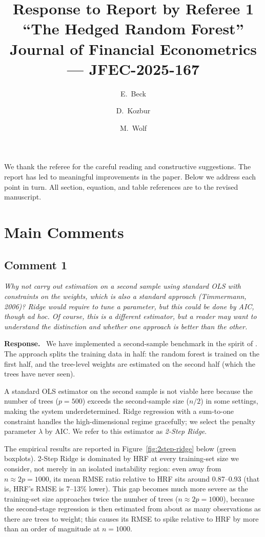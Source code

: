 \documentclass[12pt]{article}
\title{Response to Report by Referee 1\\[6pt]
  \large ``The Hedged Random Forest''\\
  \normalsize Journal of Financial Econometrics --- JFEC-2025-167}
\author{E.\ Beck \and D.\ Kozbur \and M.\ Wolf}
\date{}
\newcommand{\comment}[1]{\begin{refbox}\textit{#1}\end{refbox}}
\newcommand{\response}{\medskip\noindent\textbf{Response.}\ }
\begin{document}
\maketitle
\thispagestyle{empty}

We thank the referee for the careful reading and constructive suggestions.
The report has led to meaningful improvements in the paper.
Below we address each point in turn.
All section, equation, and table references are to the revised manuscript.

\section*{Main Comments}

\subsection*{Comment 1}

\comment{Why not carry out estimation on a second sample using standard OLS
with constraints on the weights, which is also a standard approach
(Timmermann, 2006)?  Ridge would require to tune a parameter, but this
could be done by AIC, though ad hoc.  Of course, this is a different
estimator, but a reader may want to understand the distinction and whether
one approach is better than the other.}

\response
We have implemented a second-sample benchmark in the spirit of
\citet{timmermann:2006}.
The approach splits the training data in half: the random forest is trained
on the first half, and the tree-level weights are estimated on the second
half (which the trees have never seen).

A standard OLS estimator on the second sample is not viable here because the
number of trees ($p = 500$) exceeds the second-sample size ($n/2$) in some settings,
making the system underdetermined.
Ridge regression with a sum-to-one constraint handles the high-dimensional
regime gracefully; we select the penalty parameter $\lambda$ by AIC.
We refer to this estimator as \textit{2-Step Ridge}.

The empirical results are reported in Figure~\ref{fig:2step-ridge} below
(green boxplots). 2-Step Ridge is dominated by HRF at every
training-set size we consider, not merely in an isolated instability
region: even away from $n \approx 2p = 1000$, its mean RMSE ratio
relative to HRF sits around 0.87--0.93 (that is, HRF's RMSE is
7--13\% lower). This gap becomes much more severe as the training-set
size approaches twice the number of trees ($n \approx 2p = 1000$),
because the second-stage regression is then estimated from about as
many observations as there are trees to weight; this causes its RMSE to
spike relative to HRF by more than an order of magnitude at $n = 1000$.
\end{document}
